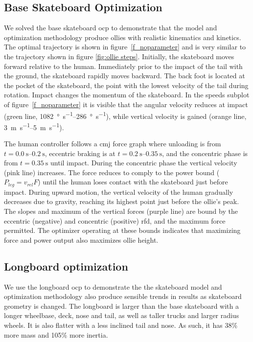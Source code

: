 \documentclass[default,iicol]{sn-jnl}
\begin{document}
\subsection{Base Skateboard Optimization}
We solved the base skateboard \gls{ocp} to demonstrate that the model and optimization methodology produce ollies with realistic kinematics and kinetics.
The optimal trajectory is shown in figure~\ref{f_noparameter} and is very similar to the trajectory shown in figure \ref{fig:ollie steps}.
Initially, the skateboard moves forward relative to the human. Immediately prior to the impact of the tail with the ground, the skateboard rapidly moves backward. 
The back foot is located at the pocket of the skateboard, the point with the lowest velocity of the tail during rotation.
Impact changes the momentum of the skateboard.
In the speeds subplot of figure~\ref{f_noparameter} it is visible that the angular velocity reduces at impact (green line, \SIrange{1082}{286}{\degree\per\second}), while vertical velocity is gained (orange line, \SIrange{3}{5}{\meter\per\second}).

The human controller follows a \gls{cmj} force graph where unloading is from $t=\SIrange{0.0}{0.2}{\second}$, eccentric braking is at $t=\SIrange{0.2}{0.35}{\second}$, and the concentric phase is from $t=\SI{0.35}{\second}$ until impact.
During the concentric phase the vertical velocity (pink line) increases.
The force reduces to comply to the power bound ($P_{leg} = v_{rel} F$) until the human loses contact with the skateboard just before impact.
During upward motion, the vertical velocity of the human gradually decreases due to gravity, reaching its highest point just before the ollie's peak.
The slopes and maximum of the vertical forces (purple line) are bound by the eccentric (negative) and concentric (positive) \gls{rfd}, and the maximum force permitted.
The optimizer operating at these bounds indicates that maximizing force and power output also maximizes ollie height.

\subsection{Longboard optimization}

We use the longboard \gls{ocp} to demonstrate the the skateboard model and optimization methodology also produce sensible trends in results as skateboard geometry is changed. The longboard is larger than the base skateboard with a longer wheelbase, deck, nose and tail, as well as taller trucks and larger radius wheels. It is also flatter with a less inclined tail and nose. As such, it has 38\% more mass and 105\% more inertia.
\end{document}
